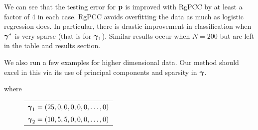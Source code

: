 \documentclass[main.tex]{subfiles}
\begin{document}

We can see that the testing error for $\mathbf{p}$ is improved with RgPCC by at least a factor of 4 in each case. RgPCC avoids overfitting the data as much as logistic regression does. In particular, there is drastic improvement in classification when $\boldsymbol \gamma^*$ is very sparse (that is for $\boldsymbol \gamma_1$). Similar results occur when $N = 200$ but are left in the table and results section.

We also run a few examples for higher dimensional data. Our method should excel in this via its use of principal components and sparsity in $\boldsymbol \gamma$.

where

\begin{figure}[H]
	\begin{tabular}{l}
		$\boldsymbol \gamma_1 = (25, 0, 0, 0, 0, 0, \ldots , 0)$ \\
		$\boldsymbol \gamma_2 = (10, 5, 5, 0, 0, 0, \ldots , 0)$
	\end{tabular}
\end{figure}
\end{document}
